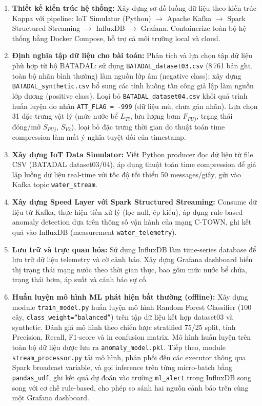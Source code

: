 \begin{enumerate}[label=\arabic*.]
  \item \textbf{Thiết kế kiến trúc hệ thống:} Xây dựng sơ đồ luồng dữ liệu theo
    kiến trúc Kappa với pipeline: IoT Simulator (Python) $\rightarrow$ Apache Kafka
    $\rightarrow$ Spark Structured Streaming $\rightarrow$ InfluxDB $\rightarrow$
    Grafana. Containerize toàn bộ hệ thống bằng Docker Compose, hỗ trợ cả môi
    trường local và cloud.

  \item \textbf{Định nghĩa tập dữ liệu cho bài toán:} Phân tích và lựa chọn tập dữ
    liệu phù hợp từ bộ BATADAL: sử dụng \texttt{BATADAL\_dataset03.csv} (8\,761 bản
    ghi, toàn bộ nhãn bình thường) làm nguồn lớp âm (negative class); xây dựng
    \texttt{BATADAL\_synthetic.csv} bổ sung các tình huống tấn công giả lập làm
    nguồn lớp dương (positive class). Loại bỏ \texttt{BATADAL\_dataset04.csv} khỏi
    quá trình huấn luyện do nhãn \texttt{ATT\_FLAG\,=\,-999} (dữ liệu mù, chưa gán
    nhãn). Lựa chọn 31 đặc trưng vật lý (mức nước bể $L_{Ti}$, lưu lượng bơm
    $F_{PUj}$, trạng thái đóng/mở $S_{PUj}$, $S_{V2}$), loại bỏ đặc trưng thời
    gian do thuật toán time compression làm mất ý nghĩa tuyệt đối của timestamp.

  \item \textbf{Xây dựng IoT Data Simulator:} Viết Python producer đọc dữ liệu từ
    file CSV (BATADAL dataset03/04), áp dụng thuật toán time compression để giả lập
    luồng dữ liệu real-time với tốc độ tối thiểu 50 messages/giây, gửi vào Kafka
    topic \texttt{water\_stream}.

  \item \textbf{Xây dựng Speed Layer với Spark Structured Streaming:} Consume dữ
    liệu từ Kafka, thực hiện tiền xử lý (lọc null, ép kiểu), áp dụng rule-based
    anomaly detection dựa trên thông số vận hành của mạng C-TOWN, ghi kết quả vào
    InfluxDB (measurement \texttt{water\_telemetry}).

  \item \textbf{Lưu trữ và trực quan hóa:} Sử dụng InfluxDB làm time-series database
    để lưu trữ dữ liệu telemetry và cờ cảnh báo. Xây dựng Grafana dashboard hiển thị
    trạng thái mạng nước theo thời gian thực, bao gồm mức nước bể chứa, trạng thái
    bơm, áp suất và cảnh báo sự cố.

  \item \textbf{Huấn luyện mô hình ML phát hiện bất thường (offline):} Xây dựng
    module \texttt{train\_model.py} huấn luyện mô hình Random Forest Classifier
    (100 cây, \texttt{class\_weight=``balanced''}) trên tập dữ liệu kết hợp
    dataset03 và synthetic. Đánh giá mô hình theo chiến lược stratified 75/25 split,
    tính Precision, Recall, F1-score và in confusion matrix. Mô hình huấn luyện
    trên toàn bộ dữ liệu được lưu ra \texttt{anomaly\_model.pkl}. Tiếp theo,
    module \texttt{stream\_processor.py} tải mô hình, phân phối đến các executor
    thông qua Spark broadcast variable, và gọi inference trên từng micro-batch
    bằng \texttt{pandas\_udf}, ghi kết quả dự đoán vào trường \texttt{ml\_alert}
    trong InfluxDB song song với cơ chế rule-based, cho phép so sánh hai nguồn
    cảnh báo trên cùng một Grafana dashboard.


\end{enumerate}
